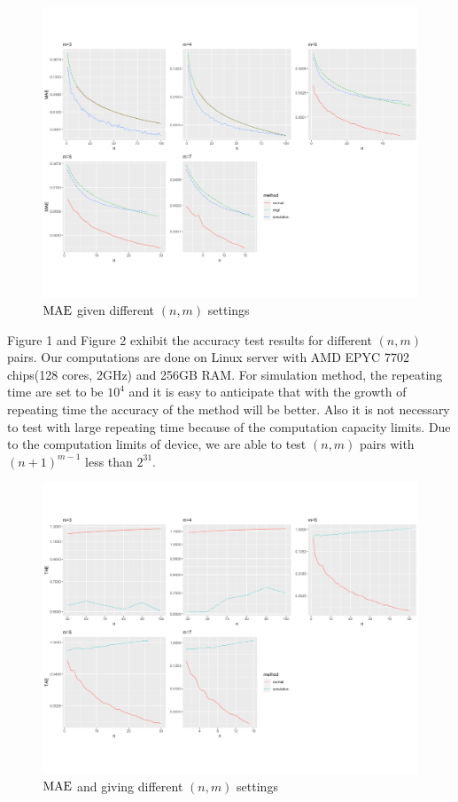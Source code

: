 \documentclass[12pt]{article}
\newcommand{\MAE}{{\rm MAE}}
\begin{document}
\begin{figure}[h]
	\centering
	\includegraphics[angle=-90,origin=c,scale=0.5]{tex/figures/mae_plot.pdf}
	\caption{$\MAE$ given different $(n,m)$ settings}
\end{figure}


Figure 1 and Figure 2 exhibit the accuracy test results for different $(n,m)$ pairs. Our computations are done on Linux server with AMD EPYC 7702 chips(128 cores, 2GHz) and 256GB RAM. For simulation method, the repeating time are set to be $10^4$ and it is easy to anticipate that with the growth of repeating  time the accuracy of the method will be better. Also it is not necessary to test with large repeating time because of the computation capacity limits. Due to the computation limits of device, we are able to test $(n,m)$ pairs with $(n+1)^{m-1}$ less than $2^{31}$. 


\begin{figure}[h]
	\centering
	\includegraphics[angle=-90,origin=c,scale=0.5]{tex/figures/tae_plot.pdf}
	\caption{$\MAE$ and giving different $(n,m)$ settings}
\end{figure}
\end{document}
